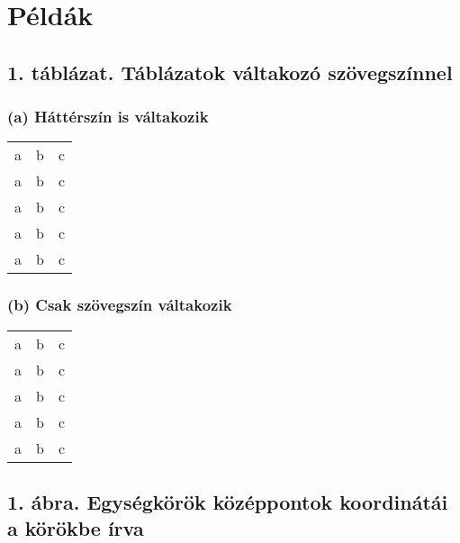 \documentclass{article}
\begin{document}
\section*{Példák}

\subsection*{1. táblázat. Táblázatok váltakozó szövegszínnel}

\subsubsection*{(a) Háttérszín is váltakozik}
\begin{table}[h!]
\centering
\begin{tabular}{|A|B|C|}
\hline
a & b & c \\
a & b & c \\
a & b & c \\
a & b & c \\
a & b & c \\
\hline
\end{tabular}
\end{table}

\subsubsection*{(b) Csak szövegszín váltakozik}
\begin{table}[h!]
\centering
\begin{tabular}{|c|c|c|}
\hline
\color{red} a & \color{blue} b & \color{orange} c \\
\color{green} a & \color{purple} b & \color{cyan} c \\
\color{magenta} a & \color{teal} b & \color{brown} c \\
\color{olive} a & \color{violet} b & \color{lime} c \\
\color{pink} a & \color{gray} b & \color{yellow} c \\
\hline
\end{tabular}
\end{table}

\subsection*{1. ábra. Egységkörök középpontok koordinátái a körökbe írva}
\begin{center}
\end{center}
\end{document}
